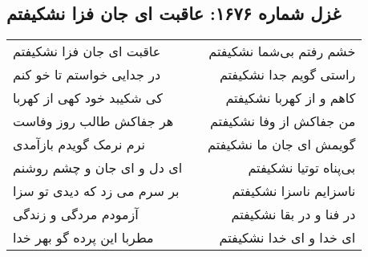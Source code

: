 \begin{center}
\section*{غزل شماره ۱۶۷۶: عاقبت ای جان فزا نشکیفتم}
\label{sec:1676}
\begin{longtable}{l p{0.5cm} r}
عاقبت ای جان فزا نشکیفتم
&&
خشم رفتم بی‌شما نشکیفتم
\\
در جدایی خواستم تا خو کنم
&&
راستی گویم جدا نشکیفتم
\\
کی شکیبد خود کهی از کهربا
&&
کاهم و از کهربا نشکیفتم
\\
هر جفاکش طالب روز وفاست
&&
من جفاکش از وفا نشکیفتم
\\
نرم نرمک گویدم بازآمدی
&&
گویمش ای جان ما نشکیفتم
\\
ای دل و ای جان و چشم روشنم
&&
بی‌پناه توتیا نشکیفتم
\\
بر سرم می زد که دیدی تو سزا
&&
ناسزایم ناسزا نشکیفتم
\\
آزمودم مردگی و زندگی
&&
در فنا و در بقا نشکیفتم
\\
مطربا این پرده گو بهر خدا
&&
ای خدا و ای خدا نشکیفتم
\\
\end{longtable}
\end{center}
